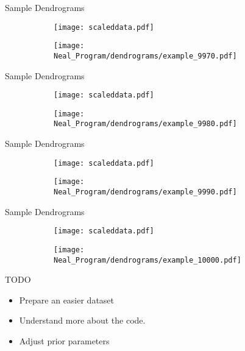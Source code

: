 \documentclass{beamer}
\begin{document}
	\begin{frame}{Sample Dendrograms}
		\begin{figure}[htbp]
			\begin{subfigure}[b]{0.45\columnwidth}
				\centering
				\texttt{[image: scaleddata.pdf]}
			\end{subfigure}
			\hfill
			\begin{subfigure}[b]{0.45\columnwidth}
				\centering
				\texttt{[image: Neal\_Program/dendrograms/example\_9970.pdf]}
			\end{subfigure}
		\end{figure}
	\end{frame}

	\begin{frame}{Sample Dendrograms}
		\begin{figure}[htbp]
			\begin{subfigure}[b]{0.45\columnwidth}
				\centering
				\texttt{[image: scaleddata.pdf]}
			\end{subfigure}
			\hfill
			\begin{subfigure}[b]{0.45\columnwidth}
				\centering
				\texttt{[image: Neal\_Program/dendrograms/example\_9980.pdf]}
			\end{subfigure}
		\end{figure}
	\end{frame}

	\begin{frame}{Sample Dendrograms}
		\begin{figure}[htbp]
			\begin{subfigure}[b]{0.45\columnwidth}
				\centering
				\texttt{[image: scaleddata.pdf]}
			\end{subfigure}
			\hfill
			\begin{subfigure}[b]{0.45\columnwidth}
				\centering
				\texttt{[image: Neal\_Program/dendrograms/example\_9990.pdf]}
			\end{subfigure}
		\end{figure}
	\end{frame}

	\begin{frame}{Sample Dendrograms}
		\begin{figure}[htbp]
			\begin{subfigure}[b]{0.45\columnwidth}
				\centering
				\texttt{[image: scaleddata.pdf]}
			\end{subfigure}
			\hfill
			\begin{subfigure}[b]{0.45\columnwidth}
				\centering
				\texttt{[image: Neal\_Program/dendrograms/example\_10000.pdf]}
			\end{subfigure}
		\end{figure}
	\end{frame}

	\begin{frame}{TODO}
		\begin{itemize}
			\item Prepare an easier dataset
			\item Understand more about the code. 
			\item Adjust prior parameters
		\end{itemize}
	\end{frame}
\end{document}
